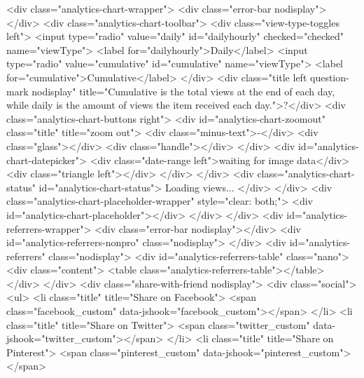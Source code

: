         <div class="analytics-chart-wrapper">
            <div class="error-bar nodisplay"></div>
            <div class="analytics-chart-toolbar">
                <div class="view-type-toggles left">
                    <input type="radio" value="daily" id="dailyhourly" checked="checked" name="viewType">
                    <label for="dailyhourly">Daily</label>
                    <input type="radio" value="cumulative" id="cumulative" name="viewType">
                    <label for="cumulative">Cumulative</label>
                </div>
                <div class="title left question-mark nodisplay" title="Cumulative is the total views at the end of each day, while daily is the amount of views the item received each day.">?</div>
                <div class="analytics-chart-buttons right">
                    <div id="analytics-chart-zoomout" class="title" title="zoom out">
                        <div class="minus-text">-</div>
                        <div class="glass"></div>
                        <div class="handle"></div>
                    </div>
                    <div id="analytics-chart-datepicker">
                        <div class="date-range left">waiting for image data</div>
                        <div class="triangle left"></div>
                    </div>
                </div>
                <div class="analytics-chart-status" id="analytics-chart-status">
                    Loading views...
                </div>
            </div>
            <div class="analytics-chart-placeholder-wrapper" style="clear: both;">
                <div id="analytics-chart-placeholder"></div>
            </div>
        </div>
        <div id="analytics-referrers-wrapper">
            <div class="error-bar nodisplay"></div>
            <div id="analytics-referrers-nonpro" class="nodisplay">
            </div>
            <div id="analytics-referrers" class="nodisplay">
                <div id="analytics-referrers-table" class="nano">
                    <div class="content">
                        <table class="analytics-referrers-table"></table>
                    </div>
                </div>
                <div class="share-with-friend nodisplay">
                    <div class="social">
    <ul>
        <li class="title" title="Share on Facebook">
            <span class="facebook_custom" data-jshook="facebook_custom"></span>
        </li>
        <li class="title" title="Share on Twitter">
            <span class="twitter_custom" data-jshook="twitter_custom"></span>
        </li>
        <li class="title" title="Share on Pinterest">
            <span class="pinterest_custom" data-jshook="pinterest_custom"></span>
